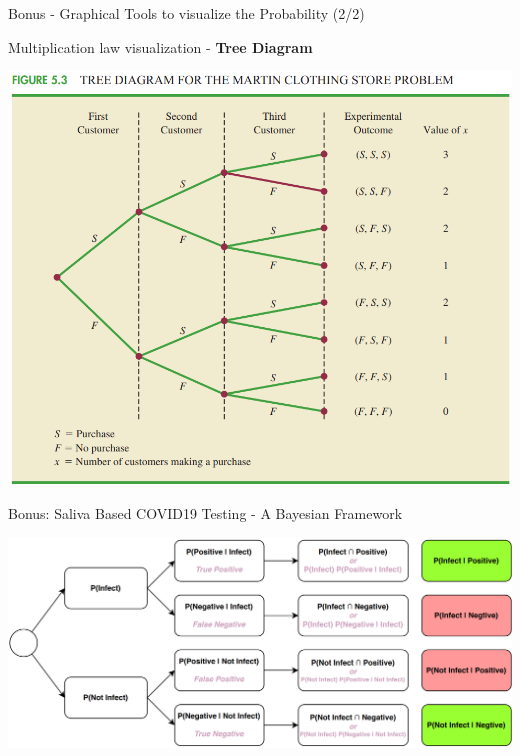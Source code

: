 \documentclass{beamer}
\begin{document}
\begin{frame}{Bonus - Graphical Tools to visualize the Probability (2/2)}

\begin{center}

Multiplication law visualization - \textbf{Tree Diagram}

\vspace{0.3 cm}

\includegraphics[scale=0.30]{images/ch3TreeDiagram.png}

\end{center}

\end{frame}

\begin{frame}{Bonus: Saliva Based COVID19 Testing - A Bayesian Framework}


\begin{flushleft}
\includegraphics[scale=0.255]{images/ch3SalivaBayesian.png}

\end{flushleft}
\end{frame}
\end{document}
